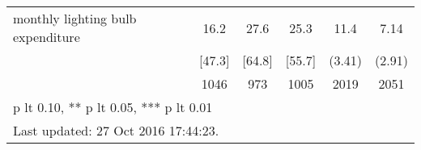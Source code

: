 \begin{table}[htbp]
\begin{tabular*}{0.9\hsize}{@{\hskip\tabcolsep\extracolsep\fill}l*{1}{ccccc}}
monthly lighting bulb expenditure&     16.2&     27.6&     25.3&     11.4\sym{***}&     7.14\sym{**} \\
                                &   [47.3]&   [64.8]&   [55.7]&   (3.41)         &   (2.91)         \\
                                &     1046&      973&     1005&     2019         &     2051         \\
\bottomrule
\multicolumn{6}{l}{\footnotesize * p lt 0.10, ** p lt 0.05, *** p lt 0.01}\\
\multicolumn{6}{l}{\footnotesize Last updated: 27 Oct 2016 17:44:23.}\\
\end{tabular*}
\end{table}
